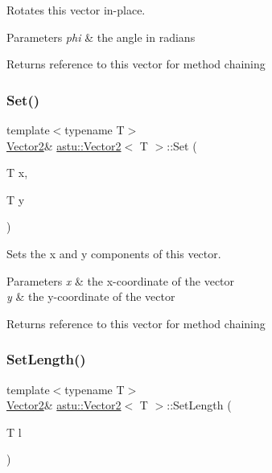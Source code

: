 Rotates this vector in-\/place.


\begin{DoxyParams}{Parameters}
{\em phi} & the angle in radians \\
\hline
\end{DoxyParams}
\begin{DoxyReturn}{Returns}
reference to this vector for method chaining 
\end{DoxyReturn}
\mbox{\label{classastu_1_1Vector2_a44e396e8e35cf3c4d1cc50de70b70220}} 
\subsubsection{\texorpdfstring{Set()}{Set()}}
{\footnotesize\ttfamily template$<$typename T$>$ \\
\hyperlink{classastu_1_1Vector2}{Vector2}\& \hyperlink{classastu_1_1Vector2}{astu\+::\+Vector2}$<$ T $>$\+::Set (\begin{DoxyParamCaption}\item[{T}]{x,  }\item[{T}]{y }\end{DoxyParamCaption})\hspace{0.3cm}{\ttfamily [inline]}}

Sets the x and y components of this vector.


\begin{DoxyParams}{Parameters}
{\em x} & the x-\/coordinate of the vector \\
\hline
{\em y} & the y-\/coordinate of the vector \\
\hline
\end{DoxyParams}
\begin{DoxyReturn}{Returns}
reference to this vector for method chaining 
\end{DoxyReturn}
\mbox{\label{classastu_1_1Vector2_afeae7c216e2c0846f576a11563a6404c}} 
\subsubsection{\texorpdfstring{Set\+Length()}{SetLength()}}
{\footnotesize\ttfamily template$<$typename T$>$ \\
\hyperlink{classastu_1_1Vector2}{Vector2}\& \hyperlink{classastu_1_1Vector2}{astu\+::\+Vector2}$<$ T $>$\+::Set\+Length (\begin{DoxyParamCaption}\item[{T}]{l }\end{DoxyParamCaption})\hspace{0.3cm}{\ttfamily [inline]}}

